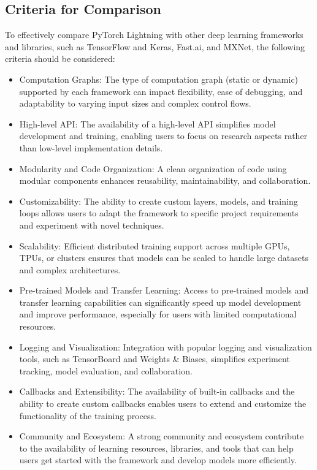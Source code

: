 \documentclass[12pt]{article}
\begin{document}
\subsection{Criteria for Comparison}

To effectively compare PyTorch Lightning with other deep learning frameworks and libraries, such as TensorFlow and Keras, Fast.ai, and MXNet, the following criteria should be considered:

\begin{itemize}
    \item Computation Graphs: The type of computation graph (static or dynamic) supported by each framework can impact flexibility, ease of debugging, and adaptability to varying input sizes and complex control flows.
    \item High-level API: The availability of a high-level API simplifies model development and training, enabling users to focus on research aspects rather than low-level implementation details.
    \item Modularity and Code Organization: A clean organization of code using modular components enhances reusability, maintainability, and collaboration.
    \item Customizability: The ability to create custom layers, models, and training loops allows users to adapt the framework to specific project requirements and experiment with novel techniques.
    \item Scalability: Efficient distributed training support across multiple GPUs, TPUs, or clusters ensures that models can be scaled to handle large datasets and complex architectures.
    \item Pre-trained Models and Transfer Learning: Access to pre-trained models and transfer learning capabilities can significantly speed up model development and improve performance, especially for users with limited computational resources.
    \item Logging and Visualization: Integration with popular logging and visualization tools, such as TensorBoard and Weights \& Biases, simplifies experiment tracking, model evaluation, and collaboration.
    \item Callbacks and Extensibility: The availability of built-in callbacks and the ability to create custom callbacks enables users to extend and customize the functionality of the training process.
    \item Community and Ecosystem: A strong community and ecosystem contribute to the availability of learning resources, libraries, and tools that can help users get started with the framework and develop models more efficiently.
\end{itemize}
\end{document}
